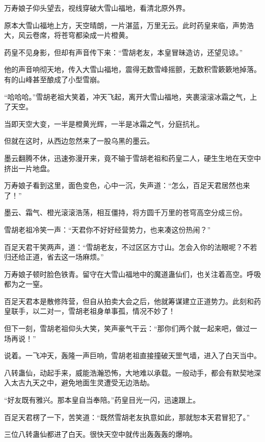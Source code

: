 
\begin{this_body}



万寿娘子仰头望去，视线穿破大雪山福地，看清北原外界。

原本大雪山福地上方，天空晴朗，一片湛蓝，万里无云。此时药皇来临，声势浩大，风云卷席，将苍穹都染成一片橙黄。

药皇不见身影，但却有声音传下来：“雪胡老友，本皇冒昧造访，还望见谅。”

他的声音响彻天地，传入大雪山福地，震得无数雪峰摇颤，无数积雪簌簌地掉落。有的山峰甚至酿成了小型雪崩。

“哈哈哈。”雪胡老祖大笑着，冲天飞起，离开大雪山福地，夹裹滚滚冰霜之气，上了天空。

当即天空大变，一半是橙黄光辉，一半是冰霜之气，分庭抗礼。

但就在这时，从西边忽然来了一股乌黑的墨云。

墨云翻腾不休，迅速弥漫开来，竟不输于雪胡老祖和药皇二人，硬生生地在天空中挤出一片地盘。

万寿娘子看到这里，面色变色，心中一沉，失声道：“怎么，百足天君居然也来了！”

墨云、霜气、橙光滚滚浩荡，相互僵持，将方圆千万里的苍穹高空分成三份。

雪胡老祖冷笑一声：“天君你不好好经营势力，也来凑这份热闹？”

百足天君干笑两声，道：“雪胡老友，不过区区方寸山。怎会入你的法眼呢？不若归还给正道，省去这一场麻烦。”

万寿娘子顿时脸色铁青。留守在大雪山福地中的魔道蛊仙们，也关注着高空。呼吸都为之一窒。

百足天君本是散修阵营，但自从拍卖大会之后，他就筹谋建立正道势力。此刻和药皇联手，以二对一，雪胡老祖身单事孤，情况不妙了！

但下一刻，雪胡老祖仰头大笑，笑声豪气干云：“那你们两个就一起来吧，做过一场再说！”

说着。一飞冲天，轰隆一声巨响，雪胡老祖直接撞破天罡气墙，进入了白天当中。

八转蛊仙，动起手来，威能浩瀚恐怖，大地难以承载。一般动手，都会有默契地深入太古九天之中，避免地面生灵遭受无边浩劫。

“好友既有雅兴。那本皇自当奉陪。”药皇目光一闪，迅速跟上。

百足天君楞了一下，苦笑道：“既然雪胡老友执意如此，那就恕本天君冒犯了。”

三位八转蛊仙都进了白天。很快天空中就传出轰轰轰的爆响。


\end{this_body}
